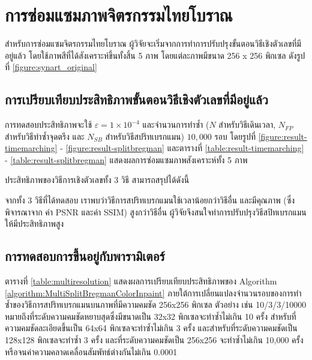 \section{การซ่อมแซมภาพจิตรกรรมไทยโบราณ}
\hspace{1cm} สำหรับการซ่อมแซมจิตรกรรมไทยโบราณ ผู้วิจัยจะเริ่มจากการทำการปรับปรุงขั้นตอนวิธีเชิงตัวเลขที่มีอยู่แล้ว โดยใช้ภาพสีที่ได้สังเคราะห์ขึ้นทั้งสิ้น 5 ภาพ โดยแต่ละภาพมีขนาด 256 x 256 พิกเซล ดังรูปที่ \ref{figure:synart_original}




\subsection{การเปรียบเทียบประสิทธิภาพขั้นตอนวิธีเชิงตัวเลขที่มีอยู่แล้ว}
\hspace{1cm}
การทดสอบประสิทธิภาพจะใช้ $\varepsilon = 1 \times 10^{-4}$ และจำนวนการทำซ้ำ ($N$ สำหรับวิธีเดินเวลา, $N_{FP}$ สำหรับวิธีทำซ้ำจุดตรึง และ $N_{SB}$ สำหรับวิธีสปริทเบรกแมน) $10,000$ รอบ โดยรูปที่ \ref{figure:result-timemarching} - \ref{figure:result-splitbregman} และตารางที่ \ref{table:result-timemarching} - \ref{table:result-splitbregman} แสดงผลการซ่อมแซมภาพสังเคราะห์ทั้ง 5 ภาพ





	





\hspace{1cm} ประสิทธิภาพของวิธีการเชิงตัวเลขทั้ง 3 วิธี สามารถสรุปได้ดังนี้

\hspace{1cm} 
จากทั้ง 3 วิธีที่ได้ทดสอบ เราพบว่าวิธีการสปริทเบรกแมนใช้เวลาน้อยกว่าวิธีอื่น และมีคุณภาพ (ซึ่งพิจารณาจาก ค่า PSNR และค่า SSIM) สูงกว่าวิธีอื่น ผู้วิจัยจึงสนใจทำการปรับปรุงวิธีสปิทเบรกแมนให้มีประสิทธิภาพสูง

\subsection{การทดสอบการขึ้นอยู่กับพารามิเตอร์}

\hspace{1cm} ตารางที่ \ref{table:multiresolution} แสดงผลการเปรียบเทียบประสิทธิภาพของ Algorithm \ref{algorithm:MultiSplitBregmanColorInpaint} ภายใต้การเปลี่ยนแปลงจำนวนรอบของการทำซ้ำของวิธีการสปริทเบรกแมนบนภาพที่มีความคมชัด 256x256 พิกเซล ตัวอย่าง เช่น 10/3/3/10000 หมายถึงที่ระดับความคมชัดหยาบสุดซึ่งมีขนาดเป็น 32x32 พิกเซลจะทำซ้ำไม่เกิน 10 ครั้ง สำหรับที่ความคมชัดละเอียดขึ้นเป็น 64x64 พิกเซลจะทำซ้ำไม่เกิน 3 ครั้ง และสำหรับที่ระดับความคมชัดเป็น 128x128 พิกเซลจะทำซ้ำ 3 ครั้ง และที่ระดับความคมชัดเป็น 256x256 จะทำซ้ำไม่เกิน 10,000 ครั้งหรือจนค่าความคลาดเคลื่อนสัมพัทธ์ต่างกันไม่เกิน 0.0001 
	
